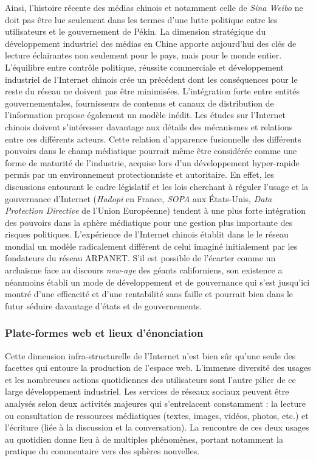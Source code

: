 Ainsi, l'histoire récente des médias chinois et notamment celle de \textit{Sina Weibo} ne doit pas être lue seulement dans les termes d'une lutte politique entre les utilisateurs et le gouvernement de Pékin. La dimension stratégique du développement industriel des médias en Chine apporte aujourd'hui des clés de lecture éclairantes non seulement pour le pays, mais pour le monde entier. L'équilibre entre contrôle politique, réussite commerciale et développement industriel de l'Internet chinois crée un précédent dont les conséquences pour le reste du réseau ne doivent pas être minimisées. L'intégration forte entre entités gouvernementales, fournisseurs de contenus et canaux de distribution de l'information propose également un modèle inédit. Les études sur l'Internet chinois doivent s'intéresser davantage aux détails des mécanismes et relations entre ces différents acteurs. Cette relation d'apparence fusionnelle des différents pouvoirs dans le champ médiatique pourrait même être considérée comme une forme de maturité de l'industrie, acquise lors d'un développement hyper-rapide permis par un environnement protectionniste et autoritaire. En effet, les  discussions entourant le cadre législatif et les lois cherchant à réguler l'usage et la gouvernance d'Internet (\textit{Hadopi} en France, \textit{SOPA} aux États-Unis, \textit{Data Protection Directive} de l'Union Européenne) tendent à une plus forte intégration des pouvoirs dans la sphère médiatique pour une gestion plus importante des risques politiques. L'expérience de l'Internet chinois établit dans le le réseau mondial un modèle  radicalement différent de celui imaginé initialement par les fondateurs du réseau ARPANET. S'il est possible de l'écarter comme un archaïsme face au discours \textit{new-age} des géants californiens, son existence a néanmoins établi un mode de développement et de gouvernance qui s'est jusqu'ici montré d'une efficacité et d'une rentabilité sans faille et pourrait bien dans le futur séduire davantage d'états et de gouvernements.

\subsubsection{Plate-formes web et lieux d'énonciation}

Cette dimension infra-structurelle de l'Internet n'est bien sûr qu'une seule des facettes qui entoure la production de l'espace web. L'immense diversité des usages et les nombreuses actions quotidiennes des utilisateurs sont l'autre pilier de ce large développement industriel. Les services de réseaux sociaux peuvent être analysés selon deux activités majeures qui s'entrelacent constamment : la lecture ou consultation de ressources médiatiques (textes, images, vidéos, photos, etc.) et l'écriture (liée à la discussion et la conversation). La rencontre de ces deux usages au quotidien donne lieu à de multiples phénomènes, portant notamment la pratique du commentaire vers des sphères nouvelles.

